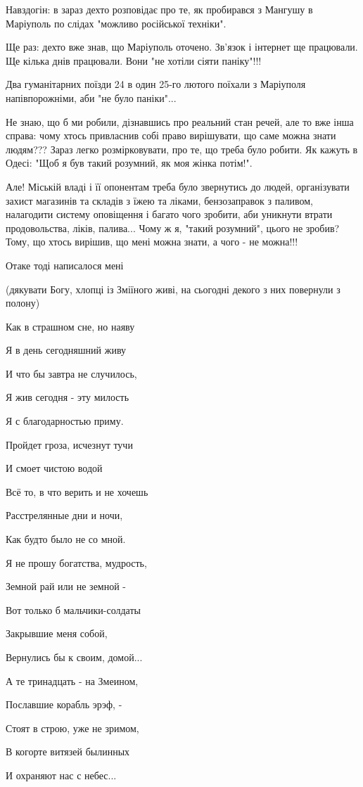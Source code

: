 Навздогін: в зараз дехто розповідає про те, як пробирався з Мангушу в Маріуполь
по слідах "можливо російської техніки".

Ще раз: дехто вже знав, що Маріуполь оточено. Зв'язок і інтернет ще працювали.
Ще кілька днів працювали. Вони "не хотіли сіяти паніку"!!!

Два гуманітарних поїзди 24 в один 25-го лютого поїхали з Маріуполя
напівпорожніми, аби "не було паніки"...

Не знаю, що б ми робили, дізнавшись про реальний стан речей, але то вже інша
справа: чому хтось привласнив собі право вирішувати, що саме можна знати
людям??? Зараз легко розмірковувати, про те, що треба було робити. Як кажуть в
Одесі: "Щоб я був такий розумний, як моя жінка потім!".

Але! Міській владі і її опонентам треба було звернутись до людей, організувати
захист магазинів та складів з їжею та ліками, бензозаправок з паливом,
налагодити систему оповіщення і багато чого зробити, аби уникнути втрати
продовольства, ліків, палива... Чому ж я, "такий розумний", цього не зробив?
Тому, що хтось вирішив, що мені можна знати, а чого - не можна!!!

Отаке тоді написалося мені

(дякувати Богу,  хлопці із Зміїного живі, на сьогодні декого з них повернули з
полону)

Как в страшном сне, но наяву

Я в день сегодняшний живу

И что бы завтра не случилось,

Я жив сегодня - эту милость

Я с благодарностью приму.

Пройдет гроза, исчезнут тучи

И смоет чистою водой

Всё то, в что верить и не хочешь

Расстрелянные дни и ночи,

Как будто было не со мной.

Я не прошу богатства, мудрость,

Земной рай или не земной -

Вот только б мальчики-солдаты

Закрывшие меня собой,

Вернулись бы к своим, домой...

А те тринадцать - на Змеином,

Пославшие корабль эрэф, -

Стоят в строю, уже не зримом,

В когорте витязей былинных

И охраняют нас с небес...

